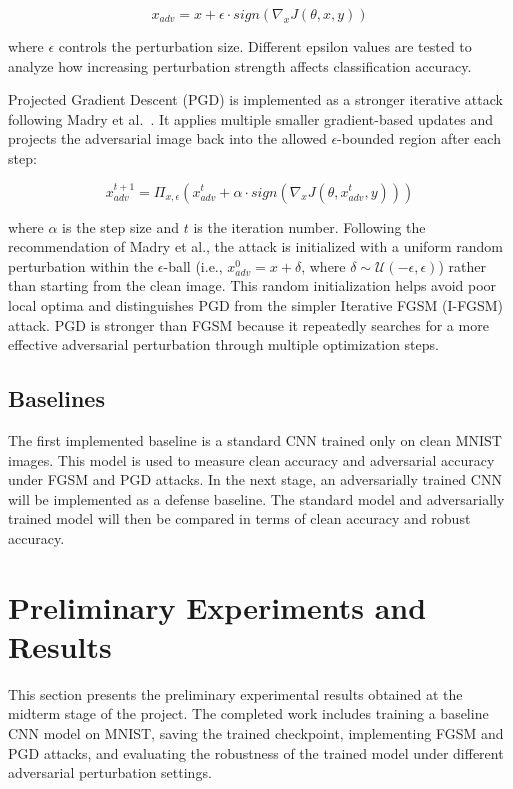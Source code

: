 \documentclass[conference]{IEEEtran}
\begin{document}
\[
x_{adv} = x + \epsilon \cdot sign(\nabla_x J(\theta, x, y))
\]

where $\epsilon$ controls the perturbation size. Different epsilon values are tested to analyze how increasing perturbation strength affects classification accuracy.

Projected Gradient Descent (PGD) is implemented as a stronger iterative attack following Madry et al.~\cite{madry2018pgd}. It applies multiple smaller gradient-based updates and projects the adversarial image back into the allowed $\epsilon$-bounded region after each step:

\[
x^{t+1}_{adv} = \Pi_{x,\epsilon}
\left(
x^t_{adv} + \alpha \cdot sign(\nabla_x J(\theta, x^t_{adv}, y))
\right)
\]

where $\alpha$ is the step size and $t$ is the iteration number. Following the recommendation of Madry et al., the attack is initialized with a uniform random perturbation within the $\epsilon$-ball (i.e., $x^0_{adv} = x + \delta$, where $\delta \sim \mathcal{U}(-\epsilon, \epsilon)$) rather than starting from the clean image. This random initialization helps avoid poor local optima and distinguishes PGD from the simpler Iterative FGSM (I-FGSM) attack. PGD is stronger than FGSM because it repeatedly searches for a more effective adversarial perturbation through multiple optimization steps.

\subsection{Baselines}

The first implemented baseline is a standard CNN trained only on clean MNIST images. This model is used to measure clean accuracy and adversarial accuracy under FGSM and PGD attacks. In the next stage, an adversarially trained CNN will be implemented as a defense baseline. The standard model and adversarially trained model will then be compared in terms of clean accuracy and robust accuracy.
\section{Preliminary Experiments and Results}

This section presents the preliminary experimental results obtained at the midterm stage of the project. The completed work includes training a baseline CNN model on MNIST, saving the trained checkpoint, implementing FGSM and PGD attacks, and evaluating the robustness of the trained model under different adversarial perturbation settings.
\end{document}
